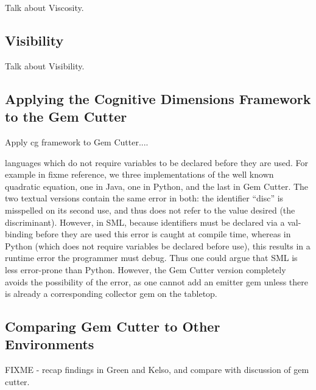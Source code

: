 Talk about Viscosity.

\subsection{Visibility}
\label{visibilityoutline}

Talk about Visibility.

\subsection{Applying the Cognitive Dimensions Framework to the Gem Cutter}

Apply cg framework to Gem Cutter....

languages which do not require variables to be declared before they are used.  For example in fixme reference, we three implementations of the well known quadratic equation, one in Java, one in Python, and the last in Gem Cutter.  The two textual versions contain the same error in both: the identifier ``disc'' is misspelled on its second use, and thus does not refer to the value desired (the discriminant).  However, in SML, because identifiers must be declared via a val-binding before they are used this error is caught at compile time, whereas in Python (which does not require variables be declared before use), this results in a runtime error the programmer must debug.  Thus one could argue that SML is less error-prone than Python.  However, the Gem Cutter version completely avoids the possibility of the error, as one cannot add an emitter gem unless there is already a corresponding collector gem on the tabletop.


\subsection{Comparing Gem Cutter to Other Environments}

FIXME - recap findings in Green and Kelso, and compare with discussion of gem cutter.